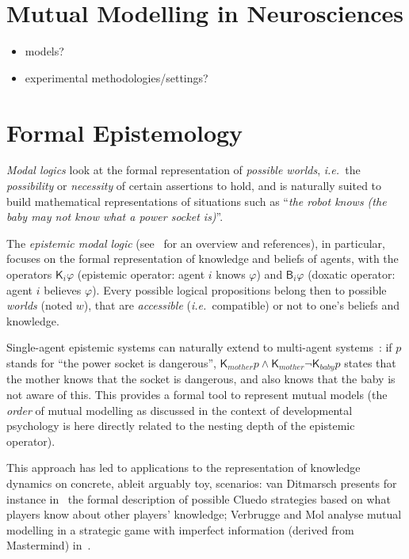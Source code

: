 \documentclass{sig-alternate}
\newcommand{\ie}{{\textit{i.e.~}}}
\begin{document}

\section{Mutual Modelling in Neurosciences}

\begin{itemize}
    \item models?
    \item experimental methodologies/settings?
\end{itemize}


\section{Formal Epistemology}
\label{formal-epistemology}

\emph{Modal logics} look at the formal representation of \emph{possible
worlds}, \ie the \emph{possibility} or \emph{necessity} of certain assertions
to hold, and is naturally suited to build mathematical representations of
situations such as ``\emph{the robot knows (the baby may not know what a power
socket is)}''.

The \emph{epistemic modal logic} (see~\cite{hendricks2008epistemic} for an
overview and references), in particular, focuses on the formal representation of
knowledge and beliefs of agents, with the operators $\mathsf{K}_{i}\varphi$
(epistemic operator: agent $i$ knows $\varphi$) and $\mathsf{B}_{i}\varphi$
(doxatic operator: agent $i$ believes $\varphi$). Every possible logical
propositions belong then to possible \emph{worlds} (noted $w$), that are
\emph{accessible} (\ie compatible) or not to one's beliefs and knowledge.

Single-agent epistemic systems can naturally extend to multi-agent systems~\cite[chapt.
4]{fagin1995reasoning}: if $p$ stands for ``the power socket is dangerous'',
$\mathsf{K}_{mother}p \wedge \mathsf{K}_{mother}\neg\mathsf{K}_{baby}p$ states
that the mother knows that the socket is dangerous, and also knows that the baby
is not aware of this. This provides a formal tool to represent mutual models
(the \emph{order} of mutual modelling as discussed in the context of
developmental psychology is here directly
related to the nesting depth of the epistemic operator).

This approach has led to applications to the representation of knowledge
dynamics on concrete, ableit arguably toy, scenarios: van Ditmarsch presents for
instance in~\cite{ditmarsch2002description} the formal description of possible
Cluedo strategies based on what players know about other players' knowledge;
Verbrugge and Mol analyse mutual modelling in a strategic game with imperfect
information (derived from Mastermind) in~\cite{verbrugge2008learning}.
\end{document}
